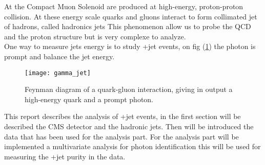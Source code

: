 
At the Compact Muon Solenoid are produced at high-energy, proton-proton collision. At these energy scale quarks and
gluons interact to form collimated jet of hadrons, called hadronics jets
This phenomenon allow us to probe the QCD and the proton structure but is very complexe to analyze.\\
One way to measure jets energy is to study \textgamma+jet events, on fig (\ref{gamma_jet}) the photon is prompt and balance the jet energy.

\begin{figure}[h!]
  \centering
  \texttt{[image: gamma\_jet]}\\[1cm]
  \caption{Feynman diagram of a quark-gluon interaction, giving in output a high-energy quark and a prompt photon.}
  \label{gamma_jet}
\end{figure}

This report describes the analysis of \textgamma+jet events, in the first section will be described the CMS detector and
the hadronic jets. Then will be introduced the data that has been used for the analysis part.
For the analysis part will be implemented a multivariate analysis for photon identification this will be used for
measuring the \textgamma+jet purity in the data.

